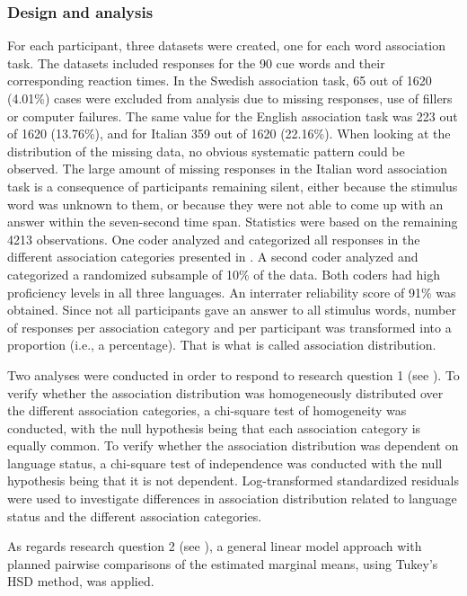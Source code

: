 \documentclass[output=paper,colorlinks,citecolor=brown,nonflat]{langsci/langscibook}
\begin{document}
\subsubsection{Design and analysis}\label{sec:gudmundson:2.2.4}

 For each participant, three datasets were created, one for each word association task. The datasets included responses for the 90 cue words and their corresponding reaction times. In the Swedish association task, 65 out of 1620 (4.01\%) cases were excluded from analysis due to missing responses, use of fillers or computer failures. The same value for the English association task was 223 out of 1620 (13.76\%), and for Italian 359 out of 1620 (22.16\%). When looking at the distribution of the missing data, no obvious systematic pattern could be observed. The large amount of missing responses in the Italian word association task is a consequence of participants remaining silent, either because the stimulus word was unknown to them, or because they were not able to come up with an answer within the seven-second time span. Statistics were based on the remaining 4213 observations. One coder analyzed and categorized all responses in the different association categories presented in . A second coder analyzed and categorized a randomized subsample of 10\% of the data. Both coders had high proficiency levels in all three languages. An interrater reliability score of 91\% was obtained.  Since not all participants gave an answer to all stimulus words, number of responses per association category and per participant was transformed into a proportion (i.e., a percentage). That is what is called association distribution.

Two analyses were conducted in order to respond to research question 1 (see ). To verify whether the association distribution was homogeneously distributed over the different association categories, a chi-square test of homogeneity was conducted, with the null hypothesis being that each association category is equally common. To verify whether the association distribution was dependent on language status, a chi-square test of independence was conducted with the null hypothesis being that it is not dependent. Log-transformed standardized residuals were used to investigate differences in association distribution related to language status and the different association categories.

As regards research question 2 (see ), a general linear model approach with planned pairwise comparisons of the estimated marginal means, using Tukey’s HSD method, was applied.
\end{document}
